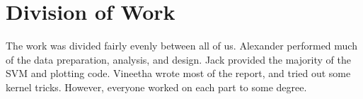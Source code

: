 \documentclass[journal]{IEEEtran}
\begin{document}
%




\section{Division of Work}
The work was divided fairly evenly between all of us. Alexander performed much of the data preparation, analysis, and design.
Jack provided the majority of the SVM and plotting code. Vineetha wrote most of the report, and tried out some kernel tricks. However, everyone worked on each part to some degree.



%
%
%
%



\end{document}
